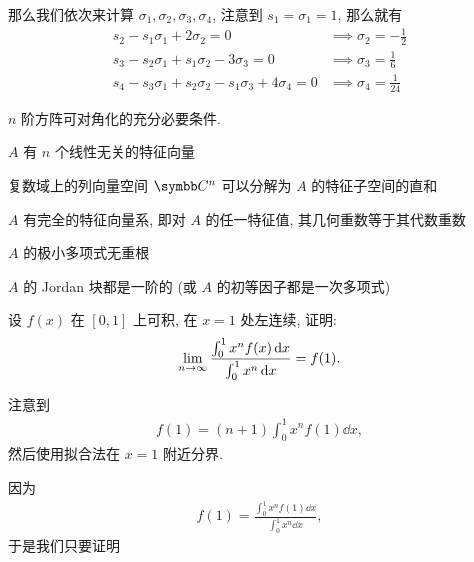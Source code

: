 \begin{exercise}[series=exer]
\begin{answer}
        那么我们依次来计算 $ \sigma_{1}, \sigma_{2}, \sigma_{3}, \sigma_{4} $, 注意到 $ s_{1} = \sigma_{1} = 1 $, 那么就有
        \begin{align*}
            s_{2} - s_{1}\sigma_{1} + 2\sigma_{2} = 0 & \implies \sigma_{2} = -\frac{1}{2}\\
            s_{3} - s_{2}\sigma_{1} + s_{1}\sigma_{2} - 3\sigma_{3} = 0 & \implies \sigma_{3} = \frac{1}{6}\\
            s_{4} - s_{3}\sigma_{1} + s_{2}\sigma_{2} - s_{1}\sigma_{3} + 4\sigma_{4} = 0 & \implies \sigma_{4} = \frac{1}{24}
        \end{align*}
    \end{answer}
    \item $ n $ 阶方阵可对角化的充分必要条件.
    \begin{hint}
        \begin{hintsheet}
            \item $ A $ 有 $ n $ 个线性无关的特征向量
            \item 复数域上的列向量空间 $ \C^{n} $ 可以分解为 $ A $ 的特征子空间的直和
            \item $ A $ 有完全的特征向量系, 即对 $ A $ 的任一特征值, 其几何重数等于其代数重数
            \item $ A $ 的极小多项式无重根
            \item $ A $ 的 Jordan 块都是一阶的 (或 $ A $ 的初等因子都是一次多项式)
        \end{hintsheet}
    \end{hint}
    \hitem 设 $ f(x) $ 在 $ [0, 1] $ 上可积, 在 $ x = 1 $ 处左连续, 证明:
    \begin{align*}
        \lim_{n \to \infty}\frac{\int_{0}^{1} x^{n} f(x) \dd{x}}{\int_{0}^{1} x^{n} \dd{x}} = f(1).
    \end{align*}
    \begin{hint}
        注意到
        \begin{align*}
            f(1) = (n + 1) \int_{0}^{1} x^{n} f(1) \dd{x},
        \end{align*}
        然后使用拟合法在 $  x = 1 $ 附近分界. 
    \end{hint}
    \begin{answer}
        因为
        \begin{align*}
            f(1) = \frac{\int_{0}^{1} x^{n} f(1) \dd{x}}{\int_{0}^{1} x^{n} \dd{x}},
        \end{align*}
        于是我们只要证明
        \begin{align*}

\end{align*}
\end{answer}
\end{exercise}

